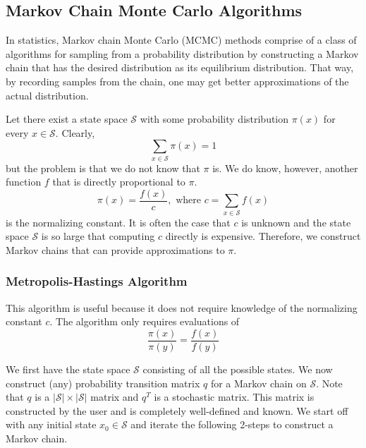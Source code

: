 \subsection{Markov Chain Monte Carlo Algorithms}

  In statistics, Markov chain Monte Carlo (MCMC) methods comprise of a class of algorithms for sampling from a probability distribution by constructing a Markov chain that has the desired distribution as its equilibrium distribution. That way, by recording samples from the chain, one may get better approximations of the actual distribution. 

  Let there exist a state space $\mathcal{S}$ with some probability distribution $\pi(x)$ for every $x \in \mathcal{S}$. Clearly, 
  \begin{equation}
    \sum_{x \in \mathcal{S}} \pi(x) = 1
  \end{equation}
  but the problem is that we do not know that $\pi$ is. We do know, however, another function $f$ that is directly proportional to $\pi$. 
  \begin{equation}
    \pi(x) = \frac{f(x)}{c}, \text{ where } c = \sum_{x \in \mathcal{S}} f(x)
  \end{equation}
  is the normalizing constant. It is often the case that $c$ is unknown and the state space $\mathcal{S}$ is so large that computing $c$ directly is expensive. Therefore, we construct Markov chains that can provide approximations to $\pi$. 

  \subsubsection{Metropolis-Hastings Algorithm}

    This algorithm is useful because it does not require knowledge of the normalizing constant $c$. The algorithm only requires evaluations of 
    \begin{equation}
      \frac{\pi(x)}{\pi(y)} = \frac{f(x)}{f(y)}
    \end{equation}

    We first have the state space $\mathcal{S}$ consisting of all the possible states. We now construct (any) probability transition matrix $q$ for a Markov chain on $\mathcal{S}$. Note that $q$ is a $|\mathcal{S}| \times |\mathcal{S}|$ matrix and $q^T$ is a stochastic matrix. This matrix is constructed by the user and is completely well-defined and known. We start off with any initial state $x_0 \in \mathcal{S}$ and iterate the following 2-steps to construct a Markov chain. 

